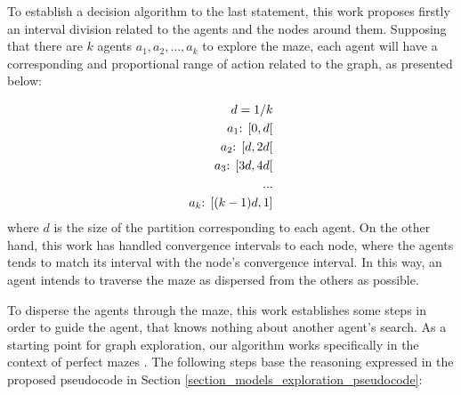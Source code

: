 To establish a decision algorithm to the last statement, this work proposes firstly an interval division related to the agents and the nodes around them. Supposing that there are $k$ agents $a_{1}, a_{2},...,a_{k}$ to explore the maze, each agent will have a corresponding and proportional range of action related to the graph, as presented below:

\begin{equation}
\label{equation_agent_intervals}
	\begin{align}
			d = 1/k\\
		a_{1} \textnormal{: } [0, d[\\
		a_{2} \textnormal{: } [d, 2d[\\
		a_{3} \textnormal{: } [3d, 4d[\\
		...\\
		a_{k} \textnormal{: } [(k-1)d, 1]
	\end{align}
\end{equation}
where $d$ is the size of the partition corresponding to each agent. On the other hand, this work has handled convergence intervals to each node, where the agents tends to match its interval with the node's convergence interval. In this way, an agent intends to traverse the maze as dispersed from the others as possible.

To disperse the agents through the maze, this work establishes some steps in order to guide the agent, that knows nothing about another agent's search. As a starting point for graph exploration, our algorithm works specifically in the context of perfect mazes \cite{Muhammad2021}. The following steps base the reasoning expressed in the proposed pseudocode in Section \ref{section_models_exploration_pseudocode}:

